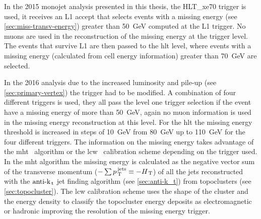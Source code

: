 In the 2015 monojet analysis presented in this thesis, the HLT\_xe70 trigger is
used, it receives an L1 accept that selects events with a missing energy (see
\cref{sec:miss-transv-energy}) greater than 50~GeV computed at the L1 trigger.
No muons are used in the reconstruction of the missing energy at the trigger
level. The events that survive L1 are then passed to the \gls{hlt} level, where
events with a missing energy (calculated from cell energy information) greater
than 70~GeV are selected.

In the 2016 analysis due to the increased luminosity and pile-up (see
\cref{sec:primary-vertex}) the trigger had to be modified. A combination of four
different triggers is used, they all pass the level one trigger selection if the
event have a missing energy of more than 50~GeV, again no muon information is
used in the missing energy reconstruction at this level. For the \gls{hlt} the
missing energy threshold is increased in steps of 10~GeV from 80~GeV up to
110~GeV for the four different triggers. The information on the missing energy
takes advantage of the \gls{mht}~\cite{MHTAlgorithm} algorithm or the
\gls{lcw}~\cite{LCWCalibration} calibration scheme depending on the trigger
used. In the \gls{mht} algorithm the missing energy is calculated as the
negative vector sum of the transverse momentum
($- \sum p_\mathrm{\, T}^\mathrm{\, jets} \equiv - H_\mathrm{\, T}$) of all the jets
reconstructed with the $\text{anti-k}_\mathrm{\, t}$ jet finding algorithm (see \cref{sec:anti-k_t})
from topoclusters (see \cref{sec:topocluster}). The \gls{lcw} calibration scheme
uses the shape of the cluster and the energy density to classify the topocluster
energy deposits as electromagnetic or hadronic improving the resolution of the
missing energy trigger.

